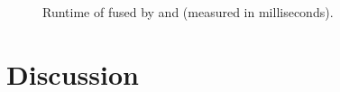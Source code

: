 \documentclass[preamble.tex]{subfiles}
\begin{document}
\begin{figure}
\caption{Runtime of \FilterMax fused by \StreamFusion and \LiveFusion (measured in milliseconds).}
\label{fig:Eval-FarAndAboves-numbers}
\end{figure}



\clearpage
\section{Discussion}


\IfNotCompilingAll{}
\end{document}
